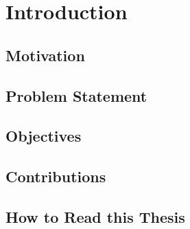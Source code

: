 

\chapter{Introduction}\label{ch:introduction}

\ifpdf
    \graphicspath{{1_introduction/figures/PNG/}{1_introduction/figures/PDF/}{1_introduction/figures/}}
\else
    \graphicspath{{1_introduction/figures/EPS/}{1_introduction/figures/}}
\fi





\section{Motivation}

\section{Problem Statement}

\section{Objectives}

\section{Contributions}

\section{How to Read this Thesis}
